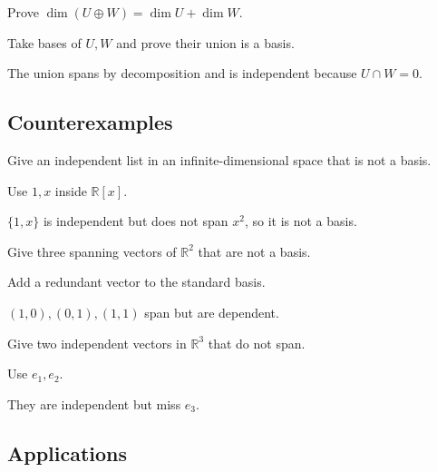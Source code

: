 \begin{exercise}\label{exr:i03-expand-09}
Prove \(\dim(U\oplus W)=\dim U+\dim W\).
\end{exercise}
\begin{hint}
Take bases of \(U,W\) and prove their union is a basis.
\end{hint}
\begin{solution}
The union spans by decomposition and is independent because \(U\cap W=0\).
\end{solution}

\subsection*{Counterexamples}

\begin{exercise}\label{exr:i03-expand-10}
Give an independent list in an infinite-dimensional space that is not a basis.
\end{exercise}
\begin{hint}
Use \(1,x\) inside \(\mathbb R[x]\).
\end{hint}
\begin{solution}
\(\{1,x\}\) is independent but does not span \(x^2\), so it is not a basis.
\end{solution}

\begin{exercise}\label{exr:i03-expand-11}
Give three spanning vectors of \(\mathbb R^2\) that are not a basis.
\end{exercise}
\begin{hint}
Add a redundant vector to the standard basis.
\end{hint}
\begin{solution}
\((1,0),(0,1),(1,1)\) span but are dependent.
\end{solution}

\begin{exercise}\label{exr:i03-expand-12}
Give two independent vectors in \(\mathbb R^3\) that do not span.
\end{exercise}
\begin{hint}
Use \(e_1,e_2\).
\end{hint}
\begin{solution}
They are independent but miss \(e_3\).
\end{solution}

\subsection*{Applications}

